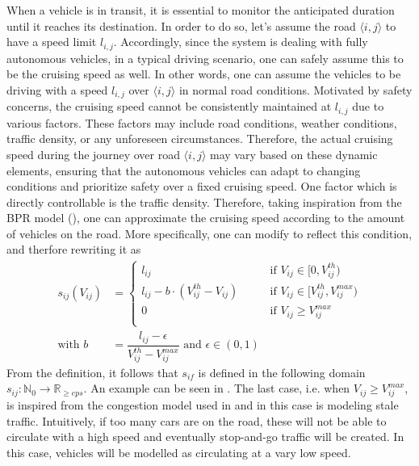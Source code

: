 When a vehicle is in transit, it is essential to monitor the anticipated duration until it reaches its destination. In order to do so, let's assume the road $\langle i,j\rangle$ to have a speed limit $l_{i,j}$. Accordingly, since the system is dealing with fully autonomous vehicles, in a typical driving scenario, one can safely assume this to be the cruising speed as well. In other words, one can assume the vehicles to be driving with a speed $l_{i,j}$ over $\langle i,j\rangle$ in normal road conditions.  Motivated by safety concerns, the cruising speed cannot be consistently maintained at $l_{i,j}$ due to various factors. These factors may include road conditions, weather conditions, traffic density, or any unforeseen circumstances. Therefore, the actual cruising speed during the journey over road $\langle i,j\rangle$ may vary based on these dynamic elements, ensuring that the autonomous vehicles can adapt to changing conditions and prioritize safety over a fixed cruising speed. One factor which is directly controllable is the traffic density. Therefore, taking inspiration from the BPR model (), one can approximate the cruising speed according to the amount of vehicles on the road. More specifically, one can modify  to reflect this condition, and therfore rewriting it as \\
\begin{equation}
	\begin{aligned}	
		s_{ij}(V_{ij}) &= \begin{cases}
			l_{ij} \quad\quad &\text{if } V_{ij}\in[0,V_{ij}^{th})\\ 
			l_{ij} - b\cdot(V_{ij}^{th}- V_{ij}) \quad\quad &\text{if }V_{ij}\in[V_{ij}^{th}, V_{ij}^{max})\\ 
			0\quad\quad &\text{if }V_{ij} \ge V_{ij}^{max}\\ 
		\end{cases}\\
		\text{with } b  &=  \dfrac{l_{ij}-\epsilon }{ V_{ij}^{th} -  V_{ij}^{max}} \text{ and } \epsilon \in (0,1)
\end{aligned}
	\label{eq:model_bpr_approximation2}
\end{equation}
From the definition, it follows that $s_{if}$ is defined in the following domain $s_{ij}: \mathbb{N}_0 \rightarrow \mathbb{R}_{\ge eps}$.
An example can be seen in . The last case, i.e. when $V_{ij} \ge V_{ij}^{max}$, is inspired from the congestion model used in  and in this case is modeling stale traffic. Intuitively, if too many cars are on the road, these will not be able to circulate with a high speed and eventually stop-and-go traffic will be created. In this case, vehicles will be modelled as circulating at a vary low speed. 

